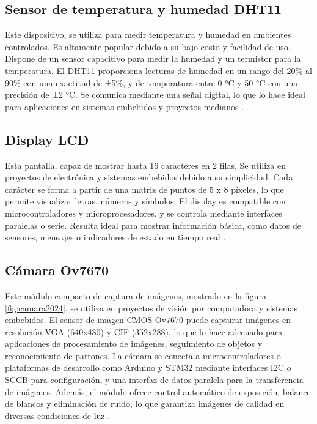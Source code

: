 \subsection{Sensor de temperatura y humedad DHT11}
\label{subsec:dht11}

Este dispositivo, se utiliza para medir temperatura y humedad en ambientes controlados. Es altamente popular debido a su bajo costo y facilidad de uso. Dispone de un sensor capacitivo para medir la humedad y un termistor para la temperatura. El DHT11 proporciona lecturas de humedad en un rango del 20\% al 90\% con una exactitud de ±5\%, y de temperatura entre 0 °C y 50 °C con una precisión de ±2 °C. Se comunica mediante una señal digital, lo que lo hace ideal para aplicaciones en sistemas embebidos y proyectos medianos \citep{WEBSITE:Dht112024}.

\subsection{Display LCD}
\label{subsec:DisplayLCD}

Esta pantalla, capaz de mostrar hasta 16 caracteres en 2 filas, Se utiliza en proyectos de electrónica y sistemas embebidos debido a su simplicidad. Cada carácter se forma a partir de una matriz de puntos de 5 x 8 píxeles, lo que permite visualizar letras, números y símbolos. El display es compatible con microcontroladores y microprocesadores, y se controla mediante interfaces paralelas o serie. Resulta ideal para mostrar información básica, como datos de sensores, mensajes o indicadores de estado en tiempo real \citep{WEBSITE:lcd2024}.

\subsection{Cámara Ov7670}
\label{subsec:camara}

Este módulo compacto de captura de imágenes, mostrado en la figura \ref{fig:camara2024}, se utiliza en proyectos de visión por computadora y sistemas embebidos. El sensor de imagen CMOS Ov7670 puede capturar imágenes en resolución VGA (640x480) y CIF (352x288), lo que lo hace adecuado para aplicaciones de procesamiento de imágenes, seguimiento de objetos y reconocimiento de patrones. La cámara se conecta a microcontroladores o plataformas de desarrollo como Arduino y STM32 mediante interfaces I2C o SCCB para configuración, y una interfaz de datos paralela para la transferencia de imágenes. Además, el módulo ofrece control automático de exposición, balance de blancos y eliminación de ruido, lo que garantiza imágenes de calidad en diversas condiciones de luz \citep{WEBSITE:camara2024}.

